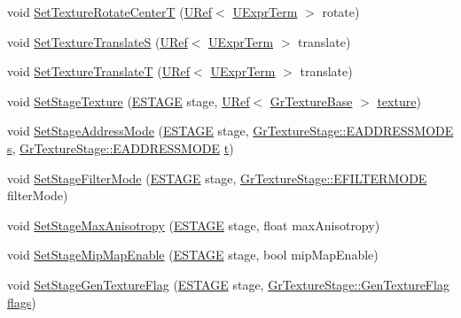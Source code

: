 \begin{CompactItemize}
\item 
void \hyperlink{class_gr_material_pass_8f15d8d892cf78090d9a214d13f4ba83}{SetTextureRotateCenterT} (\hyperlink{class_u_ref}{URef}$<$ \hyperlink{class_u_expr_term}{UExprTerm} $>$ rotate)
\item 
void \hyperlink{class_gr_material_pass_3cc6f6c62fe2f2e23a24069c20e5941c}{SetTextureTranslateS} (\hyperlink{class_u_ref}{URef}$<$ \hyperlink{class_u_expr_term}{UExprTerm} $>$ translate)
\item 
void \hyperlink{class_gr_material_pass_b53e9d97ea01a7b4de5cd8c47d14235e}{SetTextureTranslateT} (\hyperlink{class_u_ref}{URef}$<$ \hyperlink{class_u_expr_term}{UExprTerm} $>$ translate)
\item 
void \hyperlink{class_gr_material_pass_4bb9f88d516c2798a43b068400212ded}{SetStageTexture} (\hyperlink{_gr_config_8h_6df36e6af6bdeed00ff250f968160688}{ESTAGE} stage, \hyperlink{class_u_ref}{URef}$<$ \hyperlink{class_gr_texture_base}{GrTextureBase} $>$ \hyperlink{glext__bak_8h_8f486379aef534669f4f06f515e7ce6c}{texture})
\item 
void \hyperlink{class_gr_material_pass_1aea66b8b06f6c0c5de9ec7a3e1e5f01}{SetStageAddressMode} (\hyperlink{_gr_config_8h_6df36e6af6bdeed00ff250f968160688}{ESTAGE} stage, \hyperlink{class_gr_texture_stage_dea63364bc3369d0cf5ef74b76268d0e}{GrTextureStage::EADDRESSMODE} \hyperlink{glext__bak_8h_d585a1393cfa368fa9dc3d8ebff640d5}{s}, \hyperlink{class_gr_texture_stage_dea63364bc3369d0cf5ef74b76268d0e}{GrTextureStage::EADDRESSMODE} \hyperlink{glext__bak_8h_00140d6f5c548b26daf170bf16e86a6d}{t})
\item 
void \hyperlink{class_gr_material_pass_e448ff2937e697a33893312e608efcaa}{SetStageFilterMode} (\hyperlink{_gr_config_8h_6df36e6af6bdeed00ff250f968160688}{ESTAGE} stage, \hyperlink{class_gr_texture_stage_b86144a2e97311bb975db7c2c361f048}{GrTextureStage::EFILTERMODE} filterMode)
\item 
void \hyperlink{class_gr_material_pass_af2bead7532c7701623f28c1522ec354}{SetStageMaxAnisotropy} (\hyperlink{_gr_config_8h_6df36e6af6bdeed00ff250f968160688}{ESTAGE} stage, float maxAnisotropy)
\item 
void \hyperlink{class_gr_material_pass_911ebc1580fe6a279045dd4274d491e3}{SetStageMipMapEnable} (\hyperlink{_gr_config_8h_6df36e6af6bdeed00ff250f968160688}{ESTAGE} stage, bool mipMapEnable)
\item 
void \hyperlink{class_gr_material_pass_1817af9cfe2b22d4f2bd2f28d9b946e5}{SetStageGenTextureFlag} (\hyperlink{_gr_config_8h_6df36e6af6bdeed00ff250f968160688}{ESTAGE} stage, \hyperlink{class_gr_texture_stage_60f59a039bf1c95b76659752ff1bf7d6}{GrTextureStage::GenTextureFlag} \hyperlink{_u_t_message_8h_0a3c0b351ab09281b662a9ff4f900a53}{flags})

\end{CompactItemize}
